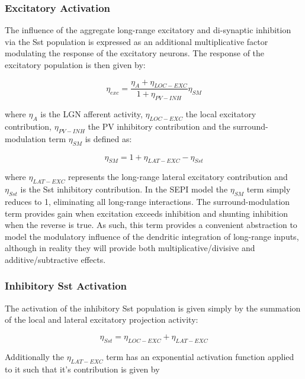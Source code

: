 \subsubsection{Excitatory Activation}

The influence of the aggregate long-range excitatory and di-synaptic
inhibition via the Sst population is expressed as an additional
multiplicative factor modulating the response of the excitatory
neurons. The response of the excitatory population is then given by:

\begin{equation}
  \eta_{exc} = \frac{\eta_{A} + \eta_{LOC-EXC}}{1 + \eta_{PV-INH}} \eta_{SM}
\end{equation}

where $\eta_{A}$ is the LGN afferent activity, $\eta_{LOC-EXC}$ the local
excitatory contribution, $\eta_{PV-INH}$ the PV inhibitory contribution
and the surround-modulation term $\eta_{SM}$ is defined as:

\begin{equation}
  \eta_{SM} = 1 + \eta_{LAT-EXC} - \eta_{Sst}
\end{equation}

where $\eta_{LAT-EXC}$ represents the long-range lateral excitatory
contribution and $\eta_{Sst}$ is the Sst inhibitory contribution. In
the SEPI model the $\eta_{SM}$ term simply reduces to 1, eliminating
all long-range interactions. The surround-modulation term provides
gain when excitation exceeds inhibition and shunting inhibition when
the reverse is true. As such, this term provides a convenient
abstraction to model the modulatory influence of the dendritic
integration of long-range inputs, although in reality they will
provide both multiplicative/divisive and additive/subtractive effects.

\subsubsection{Inhibitory Sst Activation}

The activation of the inhibitory Sst population is given simply by the
summation of the local and lateral excitatory projection activity:

\begin{equation}
  \eta_{Sst} = \eta_{LOC-EXC} + \eta_{LAT-EXC}
\end{equation}

Additionally the $\eta_{LAT-EXC}$ term has an exponential activation
function applied to it such that it's contribution is given by

